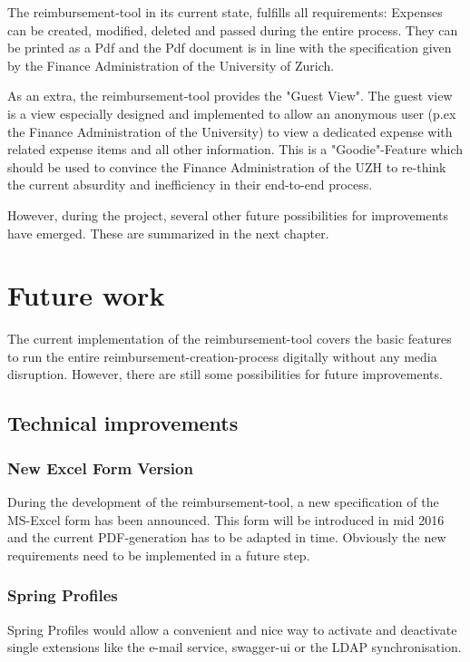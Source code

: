 The reimbursement-tool in its current state, fulfills all requirements: Expenses can be created, modified, deleted and passed during the entire process. They can be printed as a Pdf and the Pdf document is in line with the specification given by the Finance Administration of the University of Zurich. \par

As an extra, the reimbursement-tool provides the "Guest View". The guest view is a view especially designed and implemented to allow an anonymous user (p.ex the Finance Administration of the University) to view a dedicated expense with related expense items and all other information. This is a "Goodie"-Feature which should be used to convince the Finance Administration of the UZH to re-think the current absurdity and inefficiency in their end-to-end process.\par

However, during the project, several other future possibilities for improvements have emerged. These are summarized in the next chapter.

\section{Future work}
\label{sec:future-work}

The current implementation of the reimbursement-tool covers the basic features to run the entire reimbursement-creation-process digitally without any media disruption. However, there are still some possibilities for future improvements.

\subsection{Technical improvements}
\subsubsection{New Excel Form Version}
During the development of the reimbursement-tool, a new specification of the MS-Excel form has been announced. This form will be introduced in mid 2016 and the current PDF-generation has to be adapted in time. Obviously the new requirements need to be implemented in a future step.

\subsubsection{Spring Profiles}
Spring Profiles would allow a convenient and nice way to activate and deactivate single extensions like the e-mail service, swagger-ui or the LDAP synchronisation.

